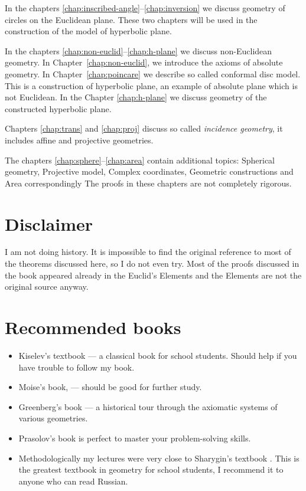 \medskip

In the chapters \ref{chap:inscribed-angle}--\ref{chap:inversion} we discuss geometry of circles on the Euclidean plane. 
These two chapters 
will be used in the construction of the model of hyperbolic plane.

In the chapters \ref{chap:non-euclid}--\ref{chap:h-plane}
we discuss non-Euclidean geometry.
In Chapter~\ref{chap:non-euclid},
we introduce the axioms of absolute geometry.
In Chapter~\ref{chap:poincare}
we describe so called conformal disc model.
This is a construction of hyperbolic plane,
an example of absolute plane which is not Euclidean.
In the Chapter \ref{chap:h-plane} we discuss geometry of the constructed hyperbolic plane.

Chapters \ref{chap:trans} 
and 
\ref{chap:proj} 
discuss so called {}\emph{incidence geometry},
it includes affine and projective geometries.

The chapters \ref{chap:sphere}--\ref{chap:area} contain additional topics:
Spherical geometry, 
Projective model,
Complex coordinates,
Geometric constructions
and Area correspondingly
The proofs in these chapters are not completely rigorous.

\section*{Disclaimer}

I am not doing history.
It is  impossible to find the original reference to most of the theorems discussed here, so I do not even try.
Most of the proofs discussed in the book 
appeared already in the Euclid's Elements
and the  Elements are not the original source anyway.

\section*{Recommended books}

\begin{itemize}
\item Kiselev's textbook \cite{kiselev} ---
a classical book for school students.
Should help if you have trouble to follow my book.

\item Moise's book, \cite{moise} ---
should be good for further study.

\item Greenberg's book \cite{greenberg}  --- a historical tour through the axiomatic systems of various geometries.

\item Prasolov's book \cite{prasolov} is perfect to master your problem-solving skills. 

\item Methodologically my lectures
were very close to Sharygin's  textbook \cite{sharygin}.
This is the greatest textbook in geometry for school students,
I recommend it to anyone who can read Russian.


\end{itemize}

